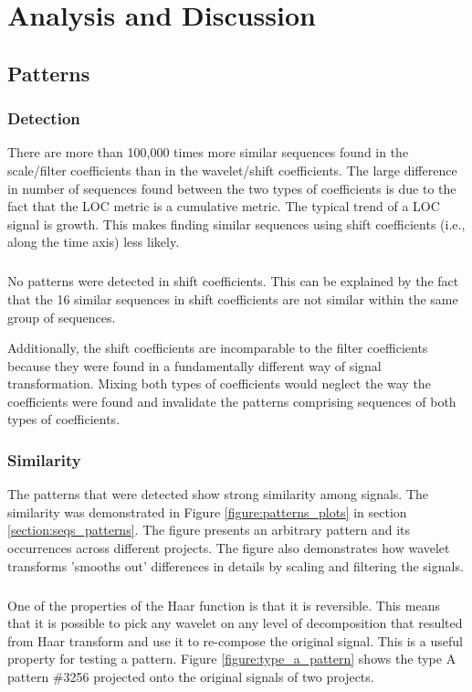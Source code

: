 \chapter{Analysis and Discussion}
\label{analysis}

\section{Patterns}
\subsection{Detection}
There are more than 100,000 times more similar sequences found in the
scale/filter coefficients than in the wavelet/shift coefficients. The large
difference in number of sequences found between the two types of coefficients
is due to the fact that the LOC metric is a cumulative metric. The typical
trend of a LOC signal is growth. This makes finding similar sequences using
shift coefficients (i.e., along the time axis) less likely.

\paragraph{}
No patterns were detected in shift coefficients. This can be explained by the
fact that the 16 similar sequences in shift coefficients are not similar within
the same group of sequences.

Additionally, the shift coefficients are incomparable to the filter coefficients
because they were found in a fundamentally different way of signal
transformation. Mixing both types of coefficients would neglect the way the
coefficients were found and invalidate the patterns comprising sequences of
both types of coefficients.

\subsection{Similarity}
The patterns that were detected show strong similarity among signals. The
similarity was demonstrated in Figure \ref{figure:patterns_plots} in section
\ref{section:seqs_patterns}. The figure presents an arbitrary pattern and its
occurrences across different projects. The figure also demonstrates how wavelet
transforms 'smooths out' differences in details by scaling and filtering the
signals.

\paragraph{}
One of the properties of the Haar function is that it is reversible. This
means that it is possible to pick any wavelet on any level of decomposition
that resulted from Haar transform and use it to re-compose the original signal.
This is a useful property for testing a pattern. Figure
\ref{figure:type_a_pattern} shows the type A pattern \#3256 projected onto the
original signals of two projects.

